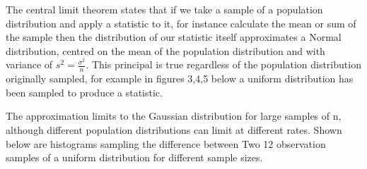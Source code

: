 \documentclass[10pt]{article}
\begin{document}
%

The central limit theorem states that if we take a sample of a population distribution and apply a statistic to it, for instance calculate the mean or sum of the sample then the distribution of our statistic itself approximates a Normal distribution, centred on the mean of the population distribution and with variance of $s^2 = \frac{\sigma^2}{n}$. This principal is true regardless of the population distribution originally sampled, for example in figures 3,4,5 below a uniform distribution has been sampled to produce a statistic. 

The approximation limits to the Gaussian distribution for large samples of n, although different population distributions can limit at different rates. Shown below are histograms sampling the difference between Two 12 observation samples of a uniform distribution for different sample sizes. 
\end{document}
